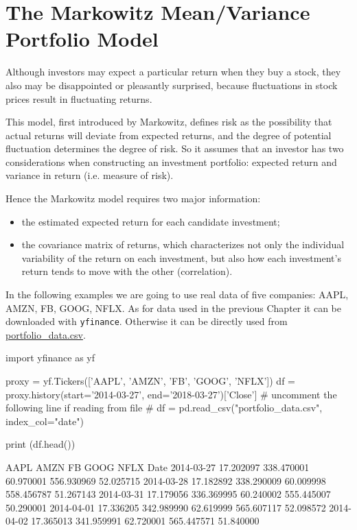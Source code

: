 \section{The Markowitz Mean/Variance Portfolio Model}
\label{the-markowitz-meanvariance-portfolio-model}

Although investors may expect a particular return when they buy a stock, they also may be disappointed or pleasantly surprised, because fluctuations in stock prices result in fluctuating returns. 

This model, first introduced by Markowitz, defines risk as the possibility that actual returns will deviate from expected returns, and the degree of potential fluctuation determines the degree of risk.
So it assumes that an investor has two considerations when constructing an investment portfolio: expected return and variance in return (i.e. measure of risk). 

Hence the Markowitz model requires two major information:

\begin{itemize}
\tightlist
\item
  the estimated expected return for each candidate investment;
\item
  the covariance matrix of returns, which characterizes not only the 
  individual variability of the return on each investment, 
  but also how each investment's return tends to move with the other (correlation).
\end{itemize}

In the following examples we are going to use real data
of five companies:  AAPL, AMZN, FB, GOOG, NFLX. As for data used in the previous Chapter
it can be downloaded with \texttt{yfinance}. Otherwise it can be directly used from \href{https://raw.githubusercontent.com/matteosan1/finance_course/develop/libro/input_files/portfolio_data.csv}{portfolio\_data.csv}.

\begin{ipython}
import yfinance as yf

proxy = yf.Tickers(['AAPL', 'AMZN', 'FB', 'GOOG', 'NFLX'])
df = proxy.history(start='2014-03-27', end='2018-03-27')['Close']
# uncomment the following line if reading from file
# df = pd.read_csv("portfolio_data.csv", index_col="date")

print (df.head())
\end{ipython}
\begin{ioutput}
                AAPL       AMZN        FB       GOOG      NFLX
Date
2014-03-27 17.202097 338.470001 60.970001 556.930969 52.025715
2014-03-28 17.182892 338.290009	60.009998 558.456787 51.267143
2014-03-31 17.179056 336.369995	60.240002 555.445007 50.290001
2014-04-01 17.336205 342.989990	62.619999 565.607117 52.098572
2014-04-02 17.365013 341.959991	62.720001 565.447571 51.840000
\end{ioutput}
 
